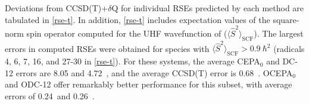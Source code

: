 Deviations from CCSD(T){+}\(\delta\)Q for individual RSEs predicted by each
method are tabulated in \cref{rse-t}.
In addition, \cref{rse-t} includes expectation values of the square-norm spin
operator computed for the UHF wavefunction of 
($\langle\hat{S}^2\rangle_\mathrm{SCF}$).
The largest errors in computed RSEs were obtained for  species with
\(
    \langle\hat{S}^2\rangle_\mathrm{SCF}
    >
    0.9\
    \hbar^2
\)
(radicals 4, 6, 7, 16, and 27-30 in \cref{rse-t}).
For these systems, the average CEPA$_0$ and DC-12 errors are 8.05 and
4.72~\kcal, and the average CCSD(T) error is 0.68~\kcal.
OCEPA$_0$ and ODC-12 offer remarkably better performance for this subset, with
average errors of 0.24~\kcal and 0.26~\kcal.
